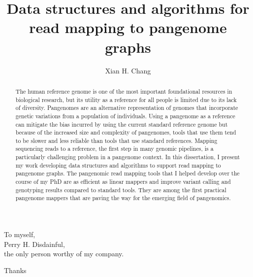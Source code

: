 \documentclass[11pt]{ucscthesis}
\begin{document}

\title{Data structures and algorithms for read mapping to pangenome graphs}
\author{Xian H. Chang}
\deanlinethree{}

\begin{frontmatter}

\maketitle
\copyrightpage

\tableofcontents
\listoffigures
\listoftables
\listofalgorithms
{}

\begin{abstract}
The human reference genome is one of the most important foundational resources in biological research, but its utility as a reference for all people is limited due to its lack of diversity.
Pangenomes are an alternative representation of genomes that incorporate genetic variations from a population of individuals.
Using a pangenome as a reference can mitigate the bias incurred by using the current standard reference genome but because of the increased size and complexity of pangenomes, tools that use them tend to be slower and less reliable than tools that use standard references.
Mapping sequencing reads to a reference, the first step in many genomic pipelines, is a particularly challenging problem in a pangenome context. 
In this dissertation, I present my work developing data structures and algorithms to support read mapping to pangenome graphs.
The pangenomic read mapping tools that I helped develop over the course of my PhD are as efficient as linear mappers and improve variant calling and genotyping results compared to standard tools.
They are among the first practical pangenome mappers that are paving the way for the emerging field of pangenomics.


\end{abstract}

\begin{dedication}
\null\vfil
{\large
\begin{center}
To myself,\\\vspace{12pt}
Perry H. Disdainful,\\\vspace{12pt}
the only person worthy of my company.
\end{center}}
\vfil\null
\end{dedication}


\begin{acknowledgements}
Thanks 
\end{acknowledgements}

\end{frontmatter}
\end{document}
